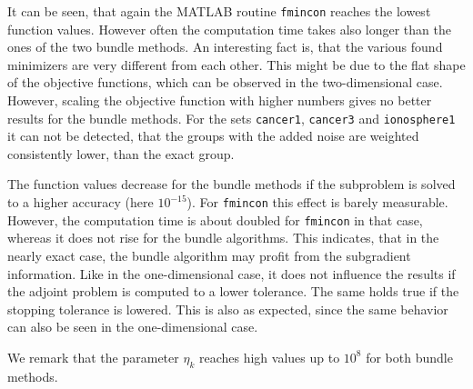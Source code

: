 It can be seen, that again the MATLAB routine \texttt{fmincon} reaches the lowest function values. However often the computation time takes also longer than the ones of the two bundle methods.
An interesting fact is, that the various found minimizers are very different from each other.
This might be due to the flat shape of the objective functions, which can be observed in the two-dimensional case.
However, scaling the objective function with higher numbers gives no better results for the bundle methods.
For the sets \texttt{cancer1}, \texttt{cancer3} and \texttt{ionosphere1} it can not be detected, that the groups with the added noise are weighted consistently lower, than the exact group.

The function values decrease for the bundle methods if the subproblem is solved to a higher accuracy (here \(10^{-15}\)). For \texttt{fmincon} this effect is barely measurable. 
However, the computation time is about doubled for \texttt{fmincon} in that case, whereas it does not rise for the bundle algorithms.
This indicates, that in the nearly exact case, the bundle algorithm may profit from the subgradient information.
Like in the one-dimensional case, it does not influence the results if the adjoint problem is computed to a lower tolerance.
The same holds true if the stopping tolerance is lowered.
This is also as expected, since the same behavior can also be seen in the one-dimensional case.

We remark that the parameter \(\eta_k\) reaches high values up to \(10^8\) for both bundle methods.


